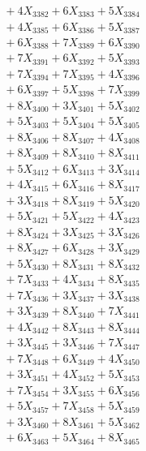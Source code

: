 \documentclass[a4paper,10pt]{article}
\begin{document}
{\begin{align}
&\;  + 4 X_{3382} + 6 X_{3383} + 5 X_{3384} \\[0.3ex]
&\;  + 4 X_{3385} + 6 X_{3386} + 5 X_{3387} \\[0.3ex]
&\;  + 6 X_{3388} + 7 X_{3389} + 6 X_{3390} \\[0.3ex]
&\;  + 7 X_{3391} + 6 X_{3392} + 5 X_{3393} \\[0.3ex]
&\;  + 7 X_{3394} + 7 X_{3395} + 4 X_{3396} \\[0.3ex]
&\;  + 6 X_{3397} + 5 X_{3398} + 7 X_{3399} \\[0.5ex]\allowbreak
&\;  + 8 X_{3400} + 3 X_{3401} + 5 X_{3402} \\[0.3ex]
&\;  + 5 X_{3403} + 5 X_{3404} + 5 X_{3405} \\[0.3ex]
&\;  + 8 X_{3406} + 8 X_{3407} + 4 X_{3408} \\[0.3ex]
&\;  + 8 X_{3409} + 8 X_{3410} + 8 X_{3411} \\[0.3ex]
&\;  + 5 X_{3412} + 6 X_{3413} + 3 X_{3414} \\[0.3ex]
&\;  + 4 X_{3415} + 6 X_{3416} + 8 X_{3417} \\[0.3ex]
&\;  + 3 X_{3418} + 8 X_{3419} + 5 X_{3420} \\[0.3ex]
&\;  + 5 X_{3421} + 5 X_{3422} + 4 X_{3423} \\[0.3ex]
&\;  + 8 X_{3424} + 3 X_{3425} + 3 X_{3426} \\[0.3ex]
&\;  + 8 X_{3427} + 6 X_{3428} + 3 X_{3429} \\[0.5ex]\allowbreak
&\;  + 5 X_{3430} + 8 X_{3431} + 8 X_{3432} \\[0.3ex]
&\;  + 7 X_{3433} + 4 X_{3434} + 8 X_{3435} \\[0.3ex]
&\;  + 7 X_{3436} + 3 X_{3437} + 3 X_{3438} \\[0.3ex]
&\;  + 3 X_{3439} + 8 X_{3440} + 7 X_{3441} \\[0.3ex]
&\;  + 4 X_{3442} + 8 X_{3443} + 8 X_{3444} \\[0.3ex]
&\;  + 3 X_{3445} + 3 X_{3446} + 7 X_{3447} \\[0.3ex]
&\;  + 7 X_{3448} + 6 X_{3449} + 4 X_{3450} \\[0.3ex]
&\;  + 3 X_{3451} + 4 X_{3452} + 5 X_{3453} \\[0.3ex]
&\;  + 7 X_{3454} + 3 X_{3455} + 6 X_{3456} \\[0.3ex]
&\;  + 5 X_{3457} + 7 X_{3458} + 5 X_{3459} \\[0.5ex]\allowbreak
&\;  + 3 X_{3460} + 8 X_{3461} + 5 X_{3462} \\[0.3ex]
&\;  + 6 X_{3463} + 5 X_{3464} + 8 X_{3465} \\[0.3ex]

\end{align}}
\end{document}
